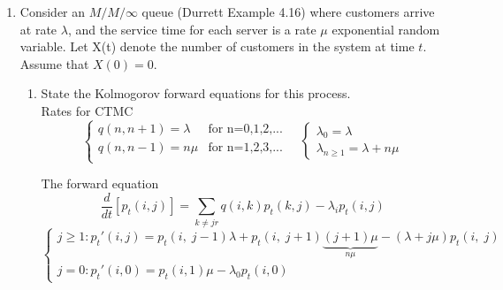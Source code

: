 \documentclass[12pt]{article}
\begin{document}

\begin{enumerate}
\item Consider an $M/M/\infty$ queue (Durrett Example 4.16) where customers arrive at rate $\lambda$, and the service time for each server is a rate $\mu$ exponential random variable. Let X(t) denote the number of customers in the system at time $t$. Assume that $X(0) = 0$.
\begin{enumerate}[label=(\alph*)]
    \item State the Kolmogorov forward equations for this process.\\
    
    Rates for CTMC
    $$\begin{cases}
    q(n,n+1)=\lambda&\text{for n=0,1,2,...}\\
    q(n,n-1)=n\mu&\text{for n=1,2,3,...}\\
    \end{cases}\quad
    \begin{cases}
    \lambda_0=\lambda\\ \lambda_{n\ge 1} = \lambda + n\mu
    \end{cases}$$
    
    The forward equation
    $$\frac{d}{dt}[p_t(i,j)]=\sum\limits_{k\neq jr} q(i,k)p_t(k,j)-\lambda_i p_t(i,j)$$
    $$\begin{cases}
    j\ge 1: p_t'(i,j) = p_t(i,\;j-1)\lambda+p_t(i,\;j+1)\underbrace{(j+1)\mu}_{n\mu}-(\lambda+j\mu) p_t(i,\;j)\\
    j=0: p_t'(i,0) = p_t(i,1)\mu-\lambda_0 p_t(i,0)
    \end{cases}$$
    

\end{enumerate}
\end{enumerate}
\end{document}
